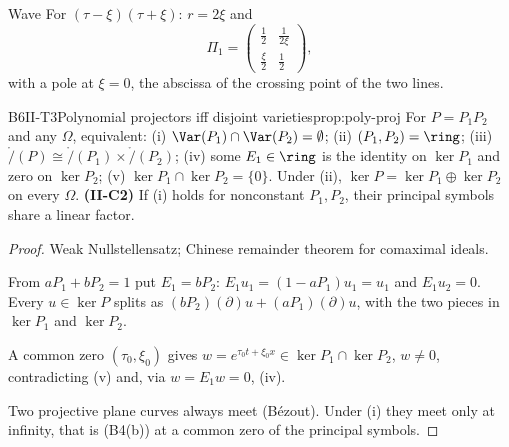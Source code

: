 \begin{example}{Wave}
For $(\tau-\xi)(\tau+\xi)$: $r=2\xi$ and
\[
\Pi_1=\begin{pmatrix}\tfrac12&\tfrac1{2\xi}\\[2pt]\tfrac\xi2&\tfrac12\end{pmatrix},
\]
with a pole at $\xi=0$, the abscissa of the crossing point of the two lines.
\end{example}

\begin{dimcard}{B6}{II-T3}{Polynomial projectors iff disjoint varieties}{\proved}{prop:poly-proj}
\label{dim:II-C2}%
For $P=P_1P_2$ and any $\Omega$, equivalent: (i) $\Var(P_1)\cap\Var(P_2)=\emptyset$; (ii) $(P_1,P_2)=\ring$; (iii) $\ring/(P)\cong\ring/(P_1)\times\ring/(P_2)$; (iv) some $E_1\in\ring$ is the identity on $\ker P_1$ and zero on $\ker P_2$; (v) $\ker P_1\cap\ker P_2=\{0\}$. Under (ii), $\ker P=\ker P_1\oplus\ker P_2$ on every $\Omega$. \textbf{(II-C2)} If (i) holds for nonconstant $P_1,P_2$, their principal symbols share a linear factor.
\end{dimcard}
\begin{proof}
Weak Nullstellensatz; Chinese remainder theorem for comaximal ideals.

From $aP_1+bP_2=1$ put $E_1=bP_2$: $E_1u_1=(1-aP_1)u_1=u_1$ and $E_1u_2=0$. Every $u\in\ker P$ splits as $(bP_2)(\partial)u+(aP_1)(\partial)u$, with the two pieces in $\ker P_1$ and $\ker P_2$.

A common zero $(\tau_0,\xi_0)$ gives $w=e^{\tau_0t+\xi_0x}\in\ker P_1\cap\ker P_2$, $w\ne0$, contradicting (v) and, via $w=E_1w=0$, (iv).

Two projective plane curves always meet (B\'ezout). Under (i) they meet only at infinity, that is (B4(b)) at a common zero of the principal symbols.
\end{proof}

